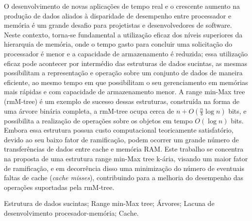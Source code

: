 O desenvolvimento de novas aplicações de tempo real e o crescente aumento na produção de dados aliados à disparidade de desempenho entre processador 
e memória é um grande desafio para projetistas e desenvolvedores de software. Neste contexto, torna-se fundamental a utilização eficaz dos níveis superiores da hierarquia de memória, onde o tempo gasto para concluir uma  solicitação do processador é menor e a capacidade de armazenamento é  reduzida; essa utilização eficaz pode acontecer por intermédio das estruturas 
de dados sucintas, as mesmas possibilitam a representação e operação sobre um conjunto de dados de maneira eficiente, ao mesmo tempo em que possibilitam  o seu gerenciamento em memórias mais rápidas e com capacidade de armazenamento menor. A range min-Max tree (rmM-tree) é um exemplo de sucesso dessas estruturas, construída na forma de uma árvore binária completa, a 
rmM-tree ocupa cerca de $n + O(\frac{n}{b} \log n)$ bits, e possibilita a realização de operações sobre os objetos em  tempo $O(\log n)$ bits. Embora essa estrutura possua custo computacional teoricamente  satisfatório, devido ao seu baixo fator de ramificação, podem ocorrer um grande número de transferências de dados entre cache e memória RAM.  Este trabalho se concentra na proposta de uma estrutura range min-Max tree k-ária, visando um maior fator de ramificação, e em decorrência disso uma minimização do número de eventuais faltas de cache (\textit{cache misses}), contribuindo para a melhoria do desempenho das operações suportadas pela rmM-tree. 


\begin{keywords}
Estrutura de dados sucintas; Range min-Max tree; Árvores; Lacuna de desenvolvimento procesador-memória; Cache.
\end{keywords}